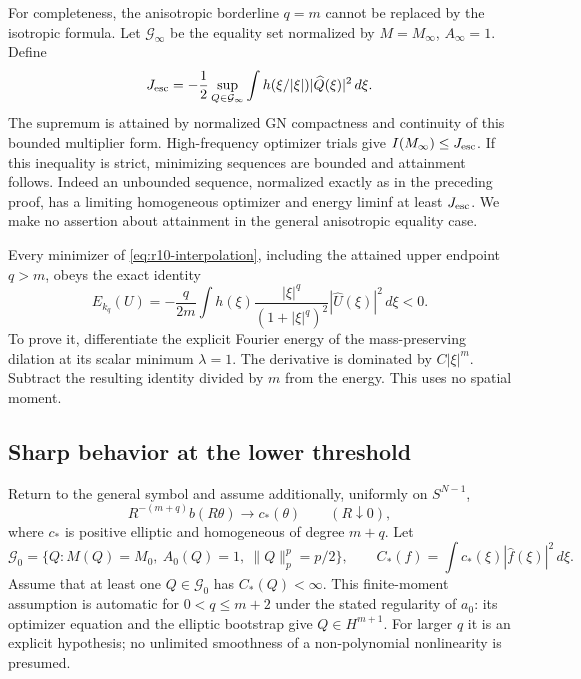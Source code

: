 For completeness, the anisotropic borderline $q=m$ cannot be replaced
by the isotropic formula. Let $\mathcal G_\infty$ be the equality set
normalized by $M=M_\infty$, $A_\infty=1$. Define
\[
 J_{\rm esc}=-\frac12\sup_{Q\in\mathcal G_\infty}
       \int h(\xi/|\xi|)|\widehat Q(\xi)|^2\,d\xi.
\]
The supremum is attained by normalized GN compactness and continuity of
this bounded multiplier form. High-frequency optimizer trials give
$I(M_\infty)\le J_{\rm esc}$. If this inequality is strict,
minimizing sequences are bounded and attainment follows. Indeed an
unbounded sequence, normalized exactly as in the preceding proof,
has a limiting homogeneous optimizer and energy liminf at least
$J_{\rm esc}$. We make no assertion about attainment in the general
anisotropic equality case.

Every minimizer of \eqref{eq:r10-interpolation}, including the attained
upper endpoint $q>m$, obeys the exact identity
\begin{equation}\label{eq:r10-exact-negative-energy}
 E_{k_q}(U)=-\frac{q}{2m}
 \int h(\xi)\frac{|\xi|^q}{(1+|\xi|^q)^2}|\widehat U(\xi)|^2\,d\xi<0.
\end{equation}
To prove it, differentiate the explicit Fourier energy of the
mass-preserving dilation at its scalar minimum $\lambda=1$. The
derivative is dominated by $C|\xi|^m$. Subtract the resulting identity
divided by $m$ from the energy. This uses no spatial moment.

\subsection{Sharp behavior at the lower threshold}

Return to the general symbol and assume additionally, uniformly on
$S^{N-1}$,
\begin{equation}\label{eq:r10-low-expansion}
 R^{-(m+q)}b(R\theta)\longrightarrow c_*(\theta)
 \qquad(R\downarrow0),
\end{equation}
where $c_*$ is positive elliptic and homogeneous of degree $m+q$.
Let
\[
 \mathcal G_0=\{Q:M(Q)=M_0,\ A_0(Q)=1,\ \|Q\|_p^p=p/2\},
 \qquad C_*(f)=\int c_*(\xi)|\widehat f(\xi)|^2\,d\xi.
\]
Assume that at least one $Q\in\mathcal G_0$ has $C_*(Q)<\infty$.
This finite-moment assumption is automatic for $0<q\le m+2$ under the
stated regularity of $a_0$: its optimizer equation and the elliptic
bootstrap give $Q\in H^{m+1}$. For larger $q$ it is an explicit
hypothesis; no unlimited smoothness of a non-polynomial nonlinearity is
presumed.

